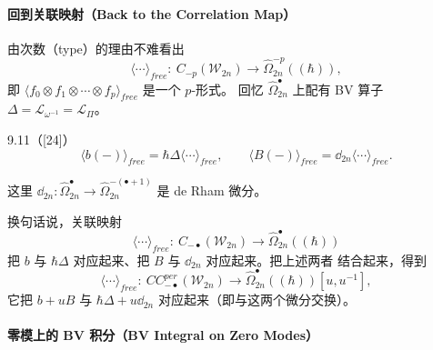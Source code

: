 \paragraph{回到关联映射（Back to the Correlation Map）}

由次数（type）的理由不难看出
\[
  \langle\cdots\rangle_{free}:\ C_{-p}(\mathcal{W}_{2n})
  \longrightarrow\widehat{\Omega}^{-p}_{2n}((\hbar)),
\]
即 $\langle f_0\otimes f_1\otimes\cdots\otimes f_p\rangle_{free}$ 是一个 $p$-形式。
回忆 $\widehat{\Omega}^{\bullet}_{2n}$ 上配有 BV 算子
$\Delta=\mathcal{L}_{\omega^{-1}}=\mathcal{L}_{\Pi}$。

\begin{wprop}{9.11}（\textup{[24]}）
  \[
    \langle b(-)\rangle_{free}=\hbar\Delta\langle\cdots\rangle_{free},
    \qquad
    \langle B(-)\rangle_{free}=\dd_{2n}\langle\cdots\rangle_{free}.
  \]
\end{wprop}

这里 $\dd_{2n}:\widehat{\Omega}^{\bullet}_{2n}
\to\widehat{\Omega}^{-(\bullet+1)}_{2n}$ 是 de Rham 微分。

换句话说，关联映射
\[
  \langle\cdots\rangle_{free}:\ C_{-\bullet}(\mathcal{W}_{2n})
  \longrightarrow\widehat{\Omega}^{\bullet}_{2n}((\hbar))
\]
把 $b$ 与 $\hbar\Delta$ 对应起来、把 $B$ 与 $\dd_{2n}$ 对应起来。把上述两者
结合起来，得到
\[
  \langle\cdots\rangle_{free}:\ CC^{per}_{-\bullet}(\mathcal{W}_{2n})
  \longrightarrow\widehat{\Omega}^{\bullet}_{2n}((\hbar))[u,u^{-1}],
\]
它把 $b+uB$ 与 $\hbar\Delta+u\dd_{2n}$ 对应起来（即与这两个微分交换）。


\paragraph{零模上的 BV 积分（BV Integral on Zero Modes）}

